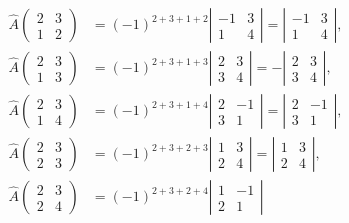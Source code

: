 \documentclass[UTF8, 12pt, fontset=fandol, oneside]{ctexart}
\begin{document}
\[
\begin{array}{rl}
\widehat{A}\left(\begin{array}{cc}2&3\\1&2\end{array}\right)
&=(-1)^{2+3+1+2}\left|\begin{array}{cc}-1&3\\1&4\end{array}\right|
=\left|\begin{array}{cc}-1&3\\1&4\end{array}\right|,\\[1.2em]
\widehat{A}\left(\begin{array}{cc}2&3\\1&3\end{array}\right)
&=(-1)^{2+3+1+3}\left|\begin{array}{cc}2&3\\3&4\end{array}\right|
=-\left|\begin{array}{cc}2&3\\3&4\end{array}\right|,\\[1.2em]
\widehat{A}\left(\begin{array}{cc}2&3\\1&4\end{array}\right)
&=(-1)^{2+3+1+4}\left|\begin{array}{cc}2&-1\\3&1\end{array}\right|
=\left|\begin{array}{cc}2&-1\\3&1\end{array}\right|,\\[1.2em]
\widehat{A}\left(\begin{array}{cc}2&3\\2&3\end{array}\right)
&=(-1)^{2+3+2+3}\left|\begin{array}{cc}1&3\\2&4\end{array}\right|
=\left|\begin{array}{cc}1&3\\2&4\end{array}\right|,\\[1.2em]
\widehat{A}\left(\begin{array}{cc}2&3\\2&4\end{array}\right)
&=(-1)^{2+3+2+4}\left|\begin{array}{cc}1&-1\\2&1\end{array}\right|

\end{array}\]
\end{document}
